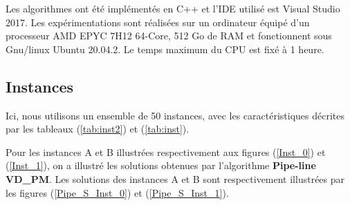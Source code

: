 Les algorithmes ont été implémentés en C++ et l'IDE utilisé est Visual Studio 2017. Les expérimentations sont réalisées sur un ordinateur équipé d'un processeur AMD EPYC 7H12 64-Core, 512 Go de RAM et
fonctionnent sous Gnu/linux Ubuntu 20.04.2. Le temps maximum du CPU est fixé à 1 heure.



\subsection{Instances}
Ici, nous utilisons un ensemble de 50 instances, avec les caractéristiques décrites par les tableaux (\ref{tab:inst2}) et (\ref{tab:inst}).

Pour les instances A et B illustrées respectivement aux figures (\ref{Inst_0}) et (\ref{Inst_1}), on a illustré les solutions obtenues par l'algorithme \textbf{Pipe-line VD\_PM}. Les solutions des instances A et B sont respectivement illustrées par les figures (\ref{Pipe_S_Inst_0}) et (\ref{Pipe_S_Inst_1}).



